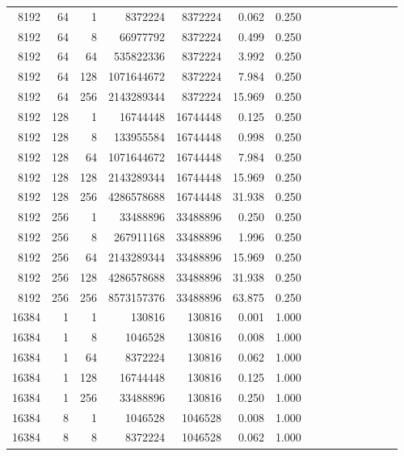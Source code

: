 \begin{longtable}{rrrrrrrrrrrrrrr}
8192 & 64 & 1 & 8372224 & 8372224 & 0.062 & 0.250 &  &  &  &  &  &  &  & \\
8192 & 64 & 8 & 66977792 & 8372224 & 0.499 & 0.250 &  &  &  &  &  &  &  & \\
8192 & 64 & 64 & 535822336 & 8372224 & 3.992 & 0.250 &  &  &  &  &  &  &  & \\
8192 & 64 & 128 & 1071644672 & 8372224 & 7.984 & 0.250 &  &  &  &  &  &  &  & \\
8192 & 64 & 256 & 2143289344 & 8372224 & 15.969 & 0.250 &  &  &  &  &  &  &  & \\
8192 & 128 & 1 & 16744448 & 16744448 & 0.125 & 0.250 &  &  &  &  &  &  &  & \\
8192 & 128 & 8 & 133955584 & 16744448 & 0.998 & 0.250 &  &  &  &  &  &  &  & \\
8192 & 128 & 64 & 1071644672 & 16744448 & 7.984 & 0.250 &  &  &  &  &  &  &  & \\
8192 & 128 & 128 & 2143289344 & 16744448 & 15.969 & 0.250 &  &  &  &  &  &  &  & \\
8192 & 128 & 256 & 4286578688 & 16744448 & 31.938 & 0.250 &  &  &  &  &  &  &  & \\
8192 & 256 & 1 & 33488896 & 33488896 & 0.250 & 0.250 &  &  &  &  &  &  &  & \\
8192 & 256 & 8 & 267911168 & 33488896 & 1.996 & 0.250 &  &  &  &  &  &  &  & \\
8192 & 256 & 64 & 2143289344 & 33488896 & 15.969 & 0.250 &  &  &  &  &  &  &  & \\
8192 & 256 & 128 & 4286578688 & 33488896 & 31.938 & 0.250 &  &  &  &  &  &  &  & \\
8192 & 256 & 256 & 8573157376 & 33488896 & 63.875 & 0.250 &  &  &  &  &  &  &  & \\
16384 & 1 & 1 & 130816 & 130816 & 0.001 & 1.000 &  &  &  &  &  &  &  & \\
16384 & 1 & 8 & 1046528 & 130816 & 0.008 & 1.000 &  &  &  &  &  &  &  & \\
16384 & 1 & 64 & 8372224 & 130816 & 0.062 & 1.000 &  &  &  &  &  &  &  & \\
16384 & 1 & 128 & 16744448 & 130816 & 0.125 & 1.000 &  &  &  &  &  &  &  & \\
16384 & 1 & 256 & 33488896 & 130816 & 0.250 & 1.000 &  &  &  &  &  &  &  & \\
16384 & 8 & 1 & 1046528 & 1046528 & 0.008 & 1.000 &  &  &  &  &  &  &  & \\
16384 & 8 & 8 & 8372224 & 1046528 & 0.062 & 1.000 &  &  &  &  &  &  &  & \\

\end{longtable}
